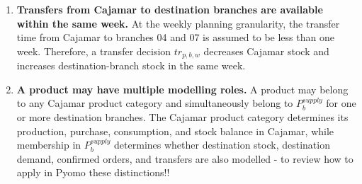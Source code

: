 \documentclass{article}
\begin{document}
\begin{enumerate}
    \item \textbf{Transfers from Cajamar to destination branches are available within the same week.}
    At the weekly planning granularity, the transfer time from Cajamar to branches 04 and 07 is assumed to be less than one week. Therefore, a transfer decision $tr_{p,b,w}$ decreases Cajamar stock and increases destination-branch stock in the same week.
    
    \item \textbf{A product may have multiple modelling roles.}
    A product may belong to any Cajamar product category and simultaneously belong to $P^{supply}_b$ for one or more destination branches. The Cajamar product category determines its production, purchase, consumption, and stock balance in Cajamar, while membership in $P^{supply}_b$ determines whether destination stock, destination demand, confirmed orders, and transfers are also modelled - to review how to apply in Pyomo these distinctions!!
    


    
\end{enumerate}
\end{document}
